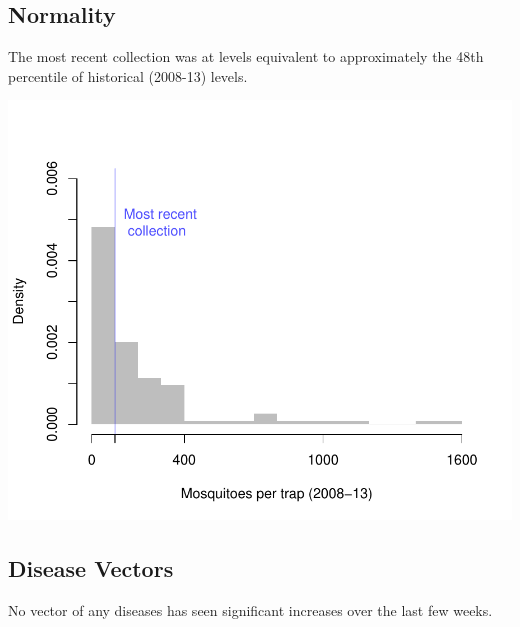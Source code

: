 \documentclass{article}
\begin{document}
\begin{multicols}{2} 


\vfill
\columnbreak
\subsection*{Normality}
The most recent collection was at levels equivalent to approximately the 48th percentile of historical (2008-13) levels.

\includegraphics{mosquitoReport-004}

\vfill
\columnbreak



\subsection*{Disease Vectors}

No vector of any diseases has seen significant increases over the last few weeks.


\end{multicols}
\end{document}
